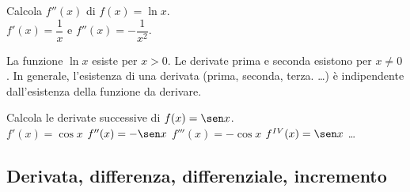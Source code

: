 \begin{esempio}
Calcola $f''(x)$ di $f(x)=\ln x$.\\
$f'(x)=\dfrac{1}{x}$ e $f''(x)=-\dfrac{1}{x^2}$.\\
\begin{osservazione}
 La funzione $\ln x $ esiste per $x>0$. Le derivate prima e seconda esistono
 per $x\ne 0$.
 In generale, l'esistenza di una derivata (prima, seconda, terza. \dots) è
 indipendente dall'esistenza della funzione da derivare.
\end{osservazione}
\end{esempio}

\begin{esempio}
 Calcola le derivate successive di $f(x)=\sen x$.\\
 $f'(x)=\cos x$ \hspace{1cm}$ f''(x)=-\sen x$ \hspace{1cm}
 $f'''(x)=-\cos x$ \hspace{1cm} $f^{IV}(x)=\sen x$ \dots
\end{esempio}

 
\subsection{Derivata, differenza, differenziale, incremento}
\label{subsec:diff01_deridiff}

